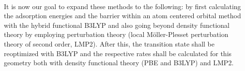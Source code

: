 \documentclass[11pt,DIV=13,BCOR=5mm,a4paper,headinclude]{scrbook}
\begin{document}
\\

It is now our goal to expand these methods to the following: by first calculating the adsorption energies and the barrier within an atom centered orbital method with the hybrid functional B3LYP and also going beyond density functional theory by employing perturbation theory (local M\"{o}ller-Plesset perturbation theory of second order, LMP2).
After this, the transition state shall be reoptimized with B3LYP and the respective rates shall be calculated for this geometry both with density functional theory (PBE and B3LYP) and LMP2.

\end{document}
